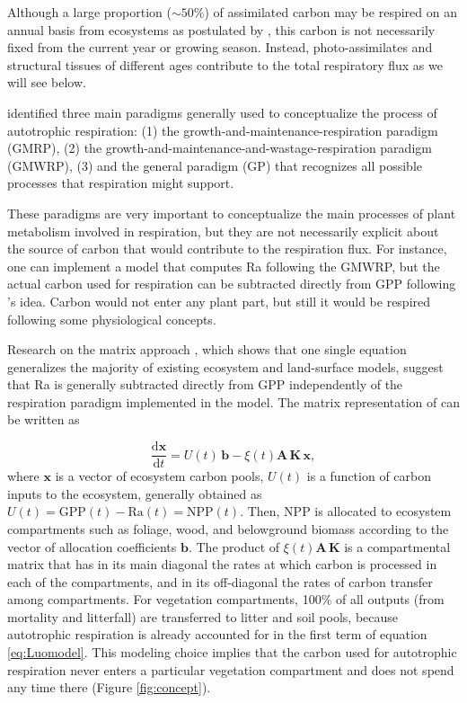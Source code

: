 \documentclass[12pt, a4paper]{article}
\begin{document}
Although a large proportion ($\sim 50\%$) of assimilated carbon may be respired on an annual basis from ecosystems as postulated by \citet{Waring1998}, this carbon is not necessarily fixed from the current year or growing season. Instead, photo-assimilates and structural tissues of different ages contribute to the total respiratory flux as we will see below.

\citet{Amthor2000} identified three main paradigms generally used to conceptualize the process of autotrophic respiration: (1) the growth-and-maintenance-respiration paradigm (GMRP), (2) the growth-and-maintenance-and-wastage-respiration paradigm (GMWRP), (3) and the general paradigm (GP) that recognizes all possible processes that respiration might support. 

These paradigms are very important to conceptualize the main processes of plant metabolism involved in respiration, but they are not necessarily explicit about the source of carbon that would contribute to the respiration flux. For instance, one can implement a model that computes Ra following the GMWRP, but the actual carbon used for respiration can be subtracted directly from GPP following \citeauthor{Waring1998}'s \citeyearpar{Waring1998} idea. Carbon would not enter any plant part, but still it would be respired following some physiological concepts. 

Research on the matrix approach \citep{Luo2017}, which shows that one single equation generalizes the majority of existing ecosystem and land-surface models, suggest that Ra is generally subtracted directly from GPP independently of the respiration paradigm implemented in the model.
The matrix representation of \citet{Luo2017} can be written as

\begin{equation} \label{eq:Luomodel}
\frac{\mathrm{d} \bm{x}}{\mathrm{d}t} =  U(t) \, \bm{b} - \xi(t) \mathbf{A} \, \mathbf{K} \, \bm{x},
\end{equation}
where $\bm{x}$ is a vector of ecosystem carbon pools, $U(t)$ is a function of carbon inputs to the ecosystem, generally obtained as $U(t) = \mathrm{GPP}(t) - \mathrm{Ra}(t) = \mathrm{NPP}(t)$. Then, NPP is allocated to ecosystem compartments such as foliage, wood, and belowground biomass according to the vector of allocation coefficients $\bm{b}$. The product of $\xi(t) \mathbf{A} \, \mathbf{K}$ is a compartmental matrix that has in its main diagonal the rates at which carbon is processed in each of the compartments, and in its off-diagonal the rates of carbon transfer among compartments. For vegetation compartments, 100\% of all outputs (from mortality and litterfall) are transferred to litter and soil pools, because autotrophic  respiration is already accounted for in the first term of  equation \eqref{eq:Luomodel}. This modeling choice implies that the carbon used for autotrophic respiration never enters a particular vegetation compartment and does not spend any time there (Figure \ref{fig:concept}).
\end{document}
